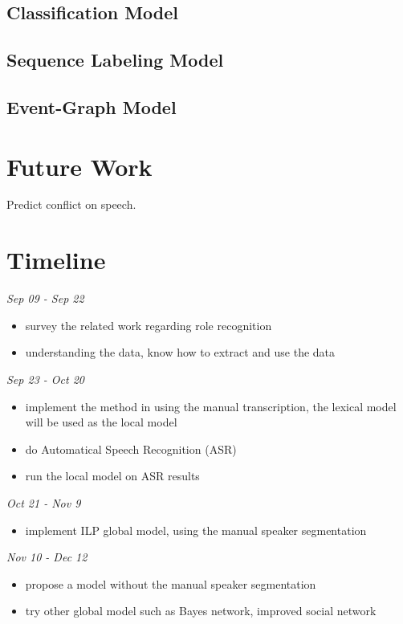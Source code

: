 \documentclass[11pt,letterpaper]{article}
\begin{document}
\subsection{Classification Model}
\begin{itemize}

\end{itemize}

\subsection{Sequence Labeling Model}

\subsection{Event-Graph Model}

\section{Future Work}
Predict conflict on speech.

\section{Timeline}

\noindent \emph{Sep 09 - Sep 22}
\begin{itemize}
  \item survey the related work regarding role recognition
  \item understanding the data, know how to extract and use the data
\end{itemize}

\noindent \emph{Sep 23 -  Oct 20}
\begin{itemize}
  \item implement the method in \cite{Garg:2008} using the manual transcription, the lexical model will be used as the local model
  \item do Automatical Speech Recognition (ASR)
  \item run the local model on ASR results
\end{itemize}

\noindent \emph{Oct 21 - Nov 9}
\begin{itemize}
  \item implement ILP global model, using the manual speaker segmentation
\end{itemize}

\noindent \emph{Nov 10 - Dec 12}
\begin{itemize}
  \item propose a model without the manual speaker segmentation
  \item try other global model such as Bayes network, improved social network
\end{itemize}
\end{document}
